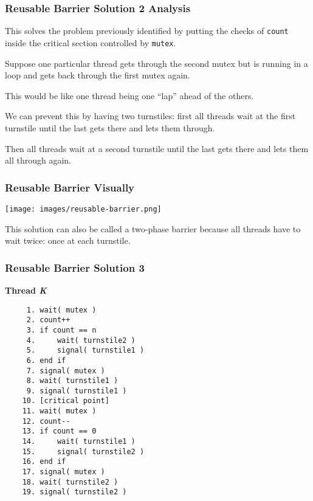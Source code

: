 \begin{frame}
\frametitle{Reusable Barrier Solution 2 Analysis}

This solves the problem previously identified by putting the checks of \texttt{count} inside the critical section controlled by \texttt{mutex}. 

Suppose one particular thread gets through the second mutex but is running in a loop and gets back through the first mutex again. 

This would be like one thread being one ``lap'' ahead of the others. 

We can prevent this by having two turnstiles: first all threads wait at the first turnstile until the last gets there and lets them through. 

Then all threads wait at a second turnstile until the last gets there and lets them all through again. 


\end{frame}

\begin{frame}
\frametitle{Reusable Barrier Visually}

\begin{center}
\texttt{[image: images/reusable-barrier.png]}
\end{center}

This solution can also be called a \alert{two-phase barrier} because all threads have to wait twice: once at each turnstile.

\end{frame}

\begin{frame}[fragile]
\frametitle{Reusable Barrier Solution 3}
\vspace{-0.5em}
\textbf{Thread \textit{K}}\vspace{-0.5em}
  \begin{verbatim}
	 1. wait( mutex )
	 2. count++
	 3. if count == n
	 4.     wait( turnstile2 )
	 5.     signal( turnstile1 )
	 6. end if
	 7. signal( mutex )
	 8. wait( turnstile1 )
	 9. signal( turnstile1 )
	10. [critical point]
	11. wait( mutex )
	12. count--
	13. if count == 0
	14.     wait( turnstile1 )
	15.     signal( turnstile2 )
	16. end if
	17. signal( mutex )
	18. wait( turnstile2 )
	19. signal( turnstile2 )
  \end{verbatim}
\vspace{-2em}


\end{frame}




